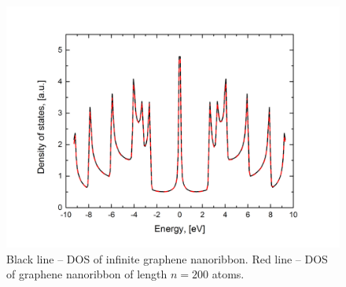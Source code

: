 \begin{figure}[h] 
\begin{center}
  \includegraphics[width=0.6\linewidth]{img/zz_ribbon_2_dos}
  \caption{Black line -- DOS of infinite graphene nanoribbon. Red line -- DOS of graphene nanoribbon of length $n=200$ atoms. \label{fig:1d_dos}}
\end{center}
\end{figure}


